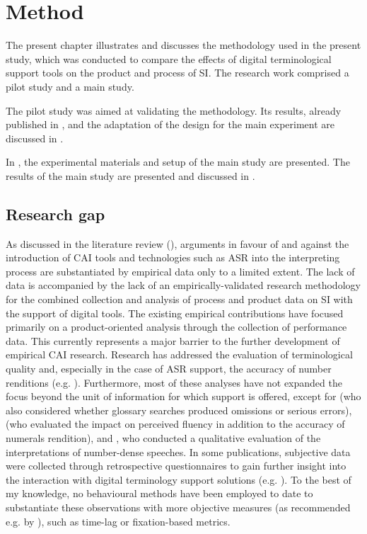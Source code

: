 \chapter{Method} \label{chapter5}



The present chapter illustrates and discusses the methodology used in the present study, which was conducted to compare the effects of digital terminological support tools on the product and process of SI. The research work comprised a pilot study and a main study.

The pilot study was aimed at validating the methodology. Its results, already published in \citet{prandi_designing_2017,prandi_exploratory_2018}, and the adaptation of the design for the main experiment are discussed in .

In , the experimental materials and setup of the main study are presented. The results of the main study are presented and discussed in .

\section{Research gap} \label{researchgap}
As discussed in the literature review (), arguments in favour of and against the introduction of CAI tools and technologies such as ASR into the interpreting process are substantiated by empirical data only to a limited extent. The lack of data is accompanied by the lack of an empirically-validated research methodology for the combined collection and analysis of process and product data on SI with the support of digital tools. The existing empirical contributions have focused primarily on a product-oriented analysis through the collection of performance data. This currently represents a major barrier to the further development of empirical CAI research. Research has addressed the evaluation of terminological quality \citep{biagini_glossario_2015,prandi_uso_2015,prandi_use_2015,van_cauwenberghe_etude_2020} and, especially in the case of ASR support, the accuracy of number renditions (e.g. \citealt{defrancq_automatic_2020,pisani_measuring_2021}). Furthermore, most of these analyses have not expanded the focus beyond the unit of information for which support is offered, except for \citet{biagini_glossario_2015} (who also considered whether glossary searches produced omissions or serious errors), \citet{montecchio_masterarbeit_maddalena_2021} (who evaluated the impact on perceived fluency in addition to the accuracy of numerals rendition), and \citet{frittella_cai-supported_2021}, who conducted a qualitative evaluation of the interpretations of number-dense speeches. In some publications, subjective data were collected through retrospective questionnaires to gain further insight into the interaction with digital terminology support solutions (e.g. \citealt{defrancq_automatic_2020,pisani_measuring_2021}). To the best of my knowledge, no behavioural methods have been employed to date to substantiate these observations with more objective measures (as recommended e.g. by \citealt[391--392]{hansen_thedialogue_2008}), such as time-lag or fixation-based metrics.

